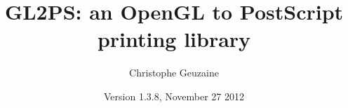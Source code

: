 %
%
%
%
%
%
%
%
%


\documentclass[10pt]{article}

\pagestyle{headings}
\setcounter{tocdepth}{2}
\sloppypar

\usepackage[colorlinks=true,urlcolor=blue]{hyperref}
\usepackage{graphicx}

\ifx\pdfoutput\undefined\else
\fi

\newcommand{\dd}{\begingroup\Url}
\newcommand{\email}[2]{\href{mailto:#2}{#1}}
\newcommand{\noemail}[2]{#1}




\title{GL2PS: an OpenGL to PostScript printing library}
\author{Christophe Geuzaine}
\date{Version 1.3.8, November 27 2012}

